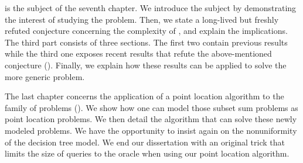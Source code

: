 \threeSUM is the subject of the seventh chapter. We introduce the
subject by demonstrating the interest of studying the \threeSUM problem. Then,
we state a long-lived but freshly refuted conjecture concerning the
complexity of \threeSUM, and explain the implications. The third part
consists of three sections. The first two contain previous results while
the third one exposes recent results that refute the above-mentioned
conjecture (\cite{gronlund:2014}). Finally, we explain how these results can be applied to solve
the more generic \kLDT problem.

The last chapter concerns the application of a point location algorithm to
the family of \kSUM problems (\cite{meiser:1993,burgisser:1997}). We show how one can model those subset sum
problems as point location problems. We then detail the algorithm that
can solve these newly modeled problems. We have the opportunity to insist again
on the nonuniformity of the decision tree model. We end our dissertation
with an original trick that limits the size of queries to the oracle when
using our point location algorithm.
